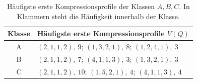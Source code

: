 \begin{table}[htbp]
\centering
\small
\begin{tabular}{cl}
\hline
Klasse & H\"aufigste erste Kompressionsprofile $V(Q)$ \\
\hline
A & $(2, 1, 1, 2),\ 9$; $(1, 3, 2, 1),\ 8$; $(1, 2, 4, 1),\ 3$ \\
B & $(2, 1, 1, 2),\ 7$; $(4, 1, 1, 3),\ 3$; $(1, 3, 2, 1),\ 3$ \\
C & $(2, 1, 1, 2),\ 10$; $(1, 5, 2, 1),\ 4$; $(4, 1, 1, 3),\ 4$ \\
\hline
\end{tabular}
\caption{H\"aufigste erste Kompressionsprofile der Klassen $A,B,C$. In Klammern steht die H\"aufigkeit innerhalb der Klasse.}
\end{table}
